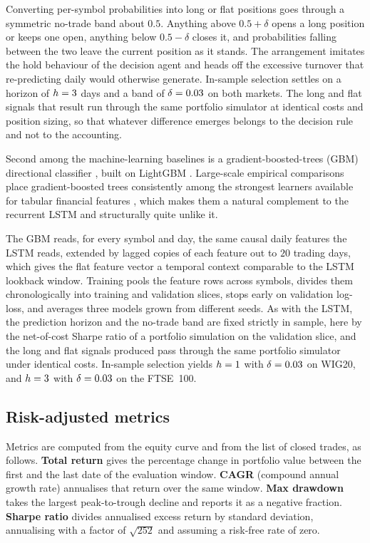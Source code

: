 Converting per-symbol probabilities into long or flat positions goes through a symmetric no-trade band about $0.5$. Anything above $0.5 + \delta$ opens a long position or keeps one open, anything below $0.5 - \delta$ closes it, and probabilities falling between the two leave the current position as it stands. The arrangement imitates the hold behaviour of the decision agent and heads off the excessive turnover that re-predicting daily would otherwise generate. In-sample selection settles on a horizon of $h = 3$ days and a band of $\delta = 0.03$ on both markets. The long and flat signals that result run through the same portfolio simulator at identical costs and position sizing, so that whatever difference emerges belongs to the decision rule and not to the accounting.

Second among the machine-learning baselines is a gradient-boosted-trees (GBM) directional classifier \cite{friedman2001}, built on LightGBM \cite{ke2017lightgbm}. Large-scale empirical comparisons place gradient-boosted trees consistently among the strongest learners available for tabular financial features \cite{krauss2017,gukellyxiu2020}, which makes them a natural complement to the recurrent LSTM and structurally quite unlike it.

The GBM reads, for every symbol and day, the same causal daily features the LSTM reads, extended by lagged copies of each feature out to $20$ trading days, which gives the flat feature vector a temporal context comparable to the LSTM lookback window. Training pools the feature rows across symbols, divides them chronologically into training and validation slices, stops early on validation log-loss, and averages three models grown from different seeds. As with the LSTM, the prediction horizon and the no-trade band are fixed strictly in sample, here by the net-of-cost Sharpe ratio of a portfolio simulation on the validation slice, and the long and flat signals produced pass through the same portfolio simulator under identical costs. In-sample selection yields $h = 1$ with $\delta = 0.03$ on WIG20, and $h = 3$ with $\delta = 0.03$ on the FTSE~100.

\subsection{Risk-adjusted metrics}\label{subsec:metrics}

Metrics are computed from the equity curve and from the list of closed trades, as follows. \textbf{Total return} gives the percentage change in portfolio value between the first and the last date of the evaluation window. \textbf{CAGR} (compound annual growth rate) annualises that return over the same window. \textbf{Max drawdown} takes the largest peak-to-trough decline and reports it as a negative fraction. \textbf{Sharpe ratio} \cite{sharpe1966} divides annualised excess return by standard deviation, annualising with a factor of $\sqrt{252}$ and assuming a risk-free rate of zero.

